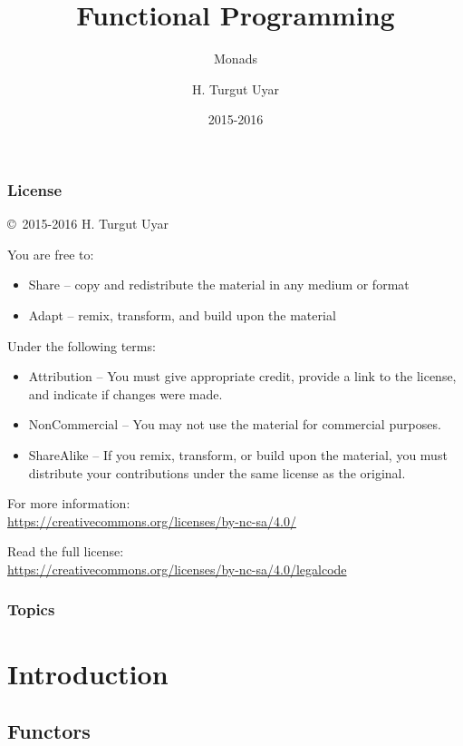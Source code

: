 \documentclass[dvipsnames]{beamer}
\title{Functional Programming}
\subtitle{Monads}
\author{H. Turgut Uyar}
\date{2015-2016}
\theoremstyle{plain}
\begin{document}
\begin{frame}
  \titlepage
\end{frame}

\begin{frame}
  \frametitle{License}

  \hfill
  \copyright~2015-2016 H. Turgut Uyar

  \vfill
  \begin{footnotesize}
    You are free to:
    \begin{itemize}
      \itemsep0em
      \item Share -- copy and redistribute the material in any medium or format
      \item Adapt -- remix, transform, and build upon the material
    \end{itemize}

    Under the following terms:
    \begin{itemize}
      \itemsep0em
      \item Attribution -- You must give appropriate credit, provide a link to
        the license, and indicate if changes were made.

      \item NonCommercial -- You may not use the material for commercial
        purposes.

      \item ShareAlike -- If you remix, transform, or build upon the material,
        you must distribute your contributions under the same license as the
        original.
    \end{itemize}

    For more information:\\
    \url{https://creativecommons.org/licenses/by-nc-sa/4.0/}

    \smallskip
    Read the full license:\\
    \url{https://creativecommons.org/licenses/by-nc-sa/4.0/legalcode}
  \end{footnotesize}
\end{frame}

\begin{frame}
  \frametitle{Topics}
  \tableofcontents
\end{frame}

\section{Introduction}

\subsection{Functors}
\end{document}
